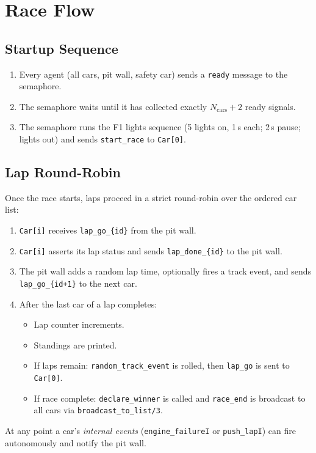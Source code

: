 \section{Race Flow}

\subsection{Startup Sequence}

\begin{enumerate}[leftmargin=2em]
  \item Every agent (all cars, pit wall, safety car) sends a \texttt{ready} message to the
        semaphore.
  \item The semaphore waits until it has collected exactly $N_\text{cars} + 2$ ready signals.
  \item The semaphore runs the F1 lights sequence (5 lights on, 1\,s each; 2\,s pause;
        lights out) and sends \texttt{start\_race} to \texttt{Car[0]}.
\end{enumerate}

\subsection{Lap Round-Robin}

Once the race starts, laps proceed in a strict round-robin over the ordered car list:

\begin{enumerate}[leftmargin=2em]
  \item \texttt{Car[i]} receives \texttt{lap\_go\_\{id\}} from the pit wall.
  \item \texttt{Car[i]} asserts its lap status and sends \texttt{lap\_done\_\{id\}} to the
        pit wall.
  \item The pit wall adds a random lap time, optionally fires a track event, and sends
        \texttt{lap\_go\_\{id+1\}} to the next car.
  \item After the last car of a lap completes:
        \begin{itemize}
          \item Lap counter increments.
          \item Standings are printed.
          \item If laps remain: \texttt{random\_track\_event} is rolled, then \texttt{lap\_go}
                is sent to \texttt{Car[0]}.
          \item If race complete: \texttt{declare\_winner} is called and \texttt{race\_end}
                is broadcast to all cars via \texttt{broadcast\_to\_list/3}.
        \end{itemize}
\end{enumerate}

\noindent
At any point a car's \emph{internal events} (\texttt{engine\_failureI} or
\texttt{push\_lapI}) can fire autonomously and notify the pit wall.

